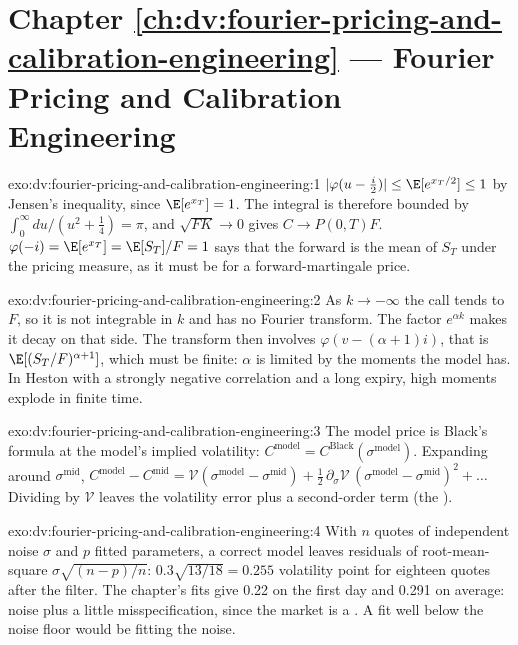 \section*{Chapter \ref{ch:dv:fourier-pricing-and-calibration-engineering} --- Fourier Pricing and Calibration Engineering}

\begin{solution}{exo:dv:fourier-pricing-and-calibration-engineering:1}
$|\varphi(u-\frac i2)|\le\E[e^{x_T/2}]\le1$ by Jensen's inequality, since $\E[e^{x_T}]=1$. The integral is therefore bounded by
$\int_0^\infty du/(u^2+\frac14)=\pi$, and $\sqrt{FK}\to0$ gives $C\to P(0,T)F$. $\varphi(-i)=\E[e^{x_T}]=\E[S_T]/F=1$ says that the forward is the
mean of $S_T$ under the pricing measure, as it must be for a forward-martingale price.
\end{solution}

\begin{solution}{exo:dv:fourier-pricing-and-calibration-engineering:2}
As $k\to-\infty$ the call tends to $F$, so it is not integrable in $k$ and has no Fourier transform. The factor $e^{\alpha k}$ makes it decay on
that side. The transform then involves $\varphi(v-(\alpha+1)i)$, that is $\E[(S_T/F)^{\alpha+1}]$, which must be finite: $\alpha$ is limited by
the moments the model has. In Heston with a strongly negative correlation and a long expiry, high moments explode in finite time.
\end{solution}

\begin{solution}{exo:dv:fourier-pricing-and-calibration-engineering:3}
The model price is Black's formula at the model's implied volatility: $C^{\text{model}}=C^{\text{Black}}(\sigma^{\text{model}})$. Expanding around
$\sigma^{\text{mid}}$, $C^{\text{model}}-C^{\text{mid}}=\mathcal V(\sigma^{\text{model}}-\sigma^{\text{mid}})+\frac12\,\partial_\sigma\mathcal
V\,(\sigma^{\text{model}}-\sigma^{\text{mid}})^2+\dots$ Dividing by $\mathcal V$ leaves the volatility error plus a second-order term (the ).
\end{solution}

\begin{solution}{exo:dv:fourier-pricing-and-calibration-engineering:4}
With $n$ quotes of independent noise $\sigma$ and $p$ fitted parameters, a correct model leaves residuals of root-mean-square
$\sigma\sqrt{(n-p)/n}$: $0.3\sqrt{13/18}=0.255$ volatility point for eighteen quotes after the filter. The chapter's fits give 0.22 on the first
day and 0.291 on average: noise plus a little misspecification, since the market is a . A fit well below the noise floor would be
fitting the noise.
\end{solution}

